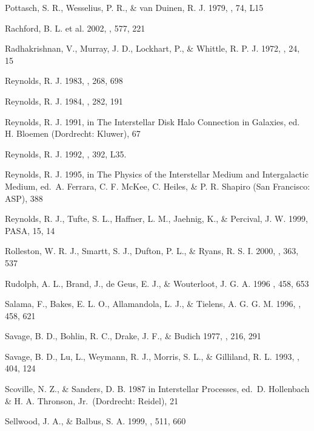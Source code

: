 \documentclass[12pt,preprint,flushrt]{aastex}
\begin{document}
\begin{thebibliography}{}
Pottasch,
        S. R., Wesselius, P. R., \& van Duinen, R. J. 1979, \aap, 74, L15

Rachford, B. L. et al. 2002,
\apj, 577, 221

Radhakrishnan, V., Murray, J. D.,
Lockhart, P., \& Whittle, R. P. J. 1972, \apjs, 24, 15

Reynolds, R. J. 1983, \apj, 268, 698

Reynolds, R. J. 1984, \apj, 282, 191

Reynolds, R. J. 1991, in The
Interstellar Disk Halo Connection in Galaxies, ed. H. Bloemen
(Dordrecht: Kluwer), 67

Reynolds, R. J. 1992, \apj, 392, L35.

Reynolds, R. J. 1995, in The Physics of the Interstellar Medium and
Intergalactic Medium, ed.\ A. Ferrara, C. F. McKee, C. Heiles,
\& P. R. Shapiro (San Francisco: ASP), 388

Reynolds, R. J., Tufte, S. L.,
Haffner, L. M., Jaehnig, K., \& Percival, J. W. 1999, PASA, 15, 14

Rolleston, W. R. J., Smartt, S. J.,
Dufton, P. L., \& Ryans, R. S. I. 2000, \aap, 363, 537

Rudolph, A. L., Brand, J., de Geus, E. J., \& Wouterloot, J. G. A. 1996
\apj, 458, 653

Salama, F., Bakes, E. L. O., Allamandola, 
L. J., \& Tielens, A. G. G. M. 1996, \apj, 458, 621

Savage, B. D., Bohlin, R. C., Drake, 
J. F., \& Budich 1977, \apj, 216, 291
 
Savage, B. D., Lu, L., Weymann, R. J.,
Morris, S. L., \& Gilliland, R. L. 1993, \apj, 404, 124

Scoville, N. Z., \& Sanders, D. B.
1987 in Interstellar Processes, ed.\ D. Hollenbach \& H. A. Thronson,
Jr.\ (Dordrecht: Reidel), 21

Sellwood, J. A., \& Balbus,
S. A. 1999, \apj, 511, 660


\end{thebibliography}
\end{document}
